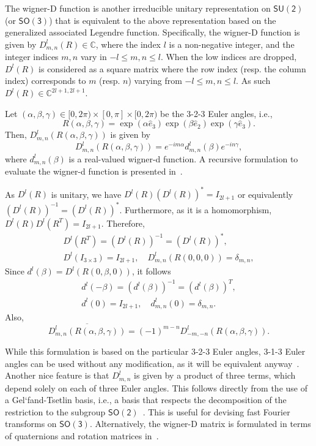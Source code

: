 \documentclass[onecolumn,11pt]{ieeetran}
\newcommand{\SO}{\ensuremath{\mathsf{SO(3)}}}
\newcommand{\Cp}{\ensuremath{\mathbb{C}}}
\begin{document}
The wigner-D function is another irreducible unitary representation on $\mathsf{SU(2)}$ (or $\SO$) that is equivalent to the above representation based on the generalized associated Legendre function. Specifically, the wigner-D function is given by $D^l_{m,n}(R)\in\Cp$, where the index $l$ is a non-negative integer, and the integer indices $m,n$ vary in $-l\leq m,n \leq l$. When the low indices are dropped, $D^l(R)$ is considered as a square matrix where the row index (resp. the column index) corresponds to $m$ (resp. $n$) varying from $-l\leq m,n \leq l$. As such $D^l(R)\in\Cp^{2l+1,2l+1}$.

Let $(\alpha,\beta,\gamma)\in[0,2\pi)\times[0,\pi]\times[0,2\pi)$ be the 3-2-3 Euler angles, i.e., 
\[
R(\alpha,\beta,\gamma)=\exp(\alpha\hat e_3)\exp(\beta\hat e_2)\exp(\gamma\hat e_3). 
\]
Then, $D^l_{m,n}(R(\alpha,\beta,\gamma))$ is given by
\begin{equation}\label{eqn:Dlmn}
D^l_{m,n}(R(\alpha,\beta,\gamma)) = e^{-i m\alpha} d^l_{m,n}(\beta) e^{-i n\gamma},
\end{equation}
where $d^l_{m,n}(\beta)$ is a real-valued wigner-d function. A recursive formulation to evaluate the wigner-d function is presented in~\cite{BlaFloJMS97}. 

As $D^l(R)$ is unitary, we have $D^l(R)(D^{l}(R))^*=I_{2l+1}$ or equivalently $(D^l(R))^{-1}=(D^l(R))^*$. Furthermore, as it is a homomorphism, $D^l(R)D^l(R^T)=I_{2l+1}$. Therefore,
\begin{gather*}
D^l(R^T) = (D^l(R))^{-1} = (D^l(R))^*,\\
D^l(I_{3\times 3}) =I_{2l+1},\quad
D^l_{m,n}(R(0,0,0))=\delta_{m,n},
\end{gather*}
Since $d^l(\beta)=D^l(R(0,\beta,0))$, it follows
\begin{gather*}
d^l(-\beta) = (d^l(\beta))^{-1} = (d^l(\beta))^T,\\
d^l(0)=I_{2l+1},\quad d^l_{m,n}(0)=\delta_{m,n}.
\end{gather*}
Also,
\begin{equation}\label{eqn:Dlmn_bar}
\overline{D^l_{m,n}(R(\alpha,\beta,\gamma))}=(-1)^{m-n} D^l_{-m,-n}(R(\alpha,\beta,\gamma)).
\end{equation}

While this formulation is based on the particular 3-2-3 Euler angles, 3-1-3 Euler angles can be used without any modification, as it will be equivalent anyway~\cite{ChiKya01}. Another nice feature is that $D^l_{m,n}$ is given by a product of three terms, which depend solely on each of three Euler angles. This follows directly from the use of a Gel`fand-Tsetlin basis, i.e., a basis that respects the decomposition of the restriction to the subgroup $\mathsf{SO(2)}$~\cite{MasRocGC97}. This is useful for devising fast Fourier transforms on $\SO$. Alternatively, the wigner-D matrix is formulated in terms of quaternions and rotation matrices in~\cite{LynStoMS89}.
\end{document}
